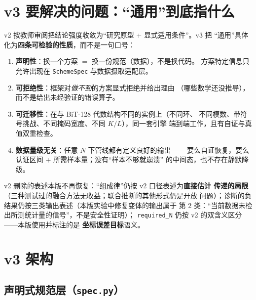 \documentclass[11pt,a4paper]{ctexart}
\begin{document}
\appendix
\section{v3 要解决的问题：``通用''到底指什么}

v2 按教师审阅把结论强度收敛为``研究原型 + 显式适用条件''。v3 把
``通用''具体化为\textbf{四条可检验的性质}，而不是一句口号：

\begin{enumerate}
  \item \textbf{声明性}：换一个方案 $=$ 换一份规范（数据），不是换代码。
        方案特定信息只允许出现在 \texttt{SchemeSpec} 与数据摄取适配层。
  \item \textbf{可拒绝性}：框架对\emph{做不到}的方案显式拒绝并给出理由
        （哪些数学还没推导），而不是给出未经验证的错误算子。
  \item \textbf{可迁移性}：在与 BiT-128 代数结构不同的实例上（不同环、
        不同模数、带符号挑战、不同掩码宽度、不同 $K/L$），同一套引擎
        端到端工作，且有自证与真值双重检查。
  \item \textbf{数据量级无关}：任意 $N$ 下管线都有定义良好的输出——
        要么自证恢复，要么认证区间 + 所需样本量；没有``样本不够就崩溃''
        的中间态，也不存在静默降级。
\end{enumerate}

\begin{fixbox}[与 v2 结论强度的衔接]
v2 删除的表述本版不再恢复：``组成律''仍按 v2 口径表述为\textbf{直接估计
传递的局限}（三种测试过的融合方法无收益；联合推断的其他形式仍是开放
问题）；诊断的负结果仍按三类输出表述（本版实验中修复变体的输出属于
第 2 类：``当前数据未检出所测统计量的信号''，不是安全性证明）；
\texttt{required\_N} 仍按 v2 的双含义区分——本版使用并标注的是
\textbf{坐标误差目标}语义。
\end{fixbox}

\section{v3 架构}

\subsection{声明式规范层（\texttt{spec.py}）}
\end{document}
